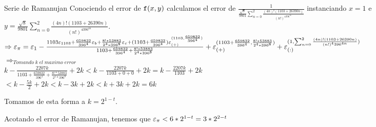 \begin{subsection}{Serie de Ramanujan}
	Conociendo el error de $\texttt{f}(x,y)$ calculamos el error de $\frac{1}{\frac{\sqrt{8}}{9801}\sum_{n=0}^{2}{\frac{(4n)!(1103+26390n)}{(n!)^4396^{4n}}}}$ instanciando $x=1$ e $y=\frac{\sqrt{8}}{9801}\sum_{n=0}^{2}{\frac{(4n)!(1103+26390n)}{(n!)^4396^{4n}}}$.\\
	
	$\Rightarrow \varepsilon _{\pi}=\varepsilon _{1} - \frac{1103\varepsilon _{1103}+\frac{659832}{396^4}\varepsilon _{b} + \frac{8!*53883}{2^4*396^8}\varepsilon _{c} + (1103+\frac{659832}{396^4})\varepsilon _{({+})}^{({1103,\frac{659832}{396^4}})}}{1103+\frac{659832}{396^4}+\frac{8!*53883}{2^4*396^8}} + \varepsilon _{({+})}^{({1103+\frac{659832}{396^4},\frac{8!*53883}{2^4*396^8}})} + \varepsilon _{({:})}^{({1,\sum_{n=0}^{2}{\frac{(4n)!(1103+26390n)}{(n!)^4396^{4n}}}})}$\\
	
	$\Rightarrow_{Tomando \; k \; el \; maximo \; error}$\\
	
	$k - {\frac{2207k}{1103+\frac{659832}{396^4}+\frac{8!*53883}{2^4*396^8}}} + 2k < k - {\frac{2207k}{1103+ 0 + 0}} + 2k = k - {\frac{2207k}{1103}} + 2k$ \\
	$< k - {\frac{5k}{2}} + 2k < k - 3k + 2k < k + 3k + 2k = 6k$
	
	Tomamos de esta forma a $k=2^{1-t}$.
	
	Acotando el error de Ramanujan, tenemos que $\varepsilon _{\pi} < 6*2^{1-t} = 3*2^{2-t}$\\
	
\end{subsection}









